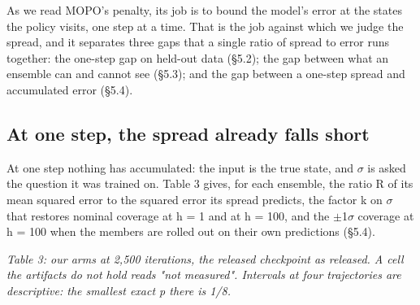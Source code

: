 \documentclass[10pt]{article}
\begin{document}
As we read MOPO's penalty, its job is to bound the model's error at the states the policy visits, one step at a time. That is the job against which we judge the spread, and it separates three gaps that a single ratio of spread to error runs together: the one-step gap on held-out data (\S{}5.2); the gap between what an ensemble can and cannot see (\S{}5.3); and the gap between a one-step spread and accumulated error (\S{}5.4).

\subsection{At one step, the spread already falls short}

At one step nothing has accumulated: the input is the true state, and $\sigma$ is asked the question it was trained on. Table 3 gives, for each ensemble, the ratio R of its mean squared error to the squared error its spread predicts, the factor k on $\sigma$ that restores nominal coverage at h = 1 and at h = 100, and the $\pm$1$\sigma$ coverage at h = 100 when the members are rolled out on their own predictions (\S{}5.4).

\begin{center}\small{}\end{center}

\emph{Table 3: our arms at 2,500 iterations, the released checkpoint as released. A cell the artifacts do not hold reads "not measured". Intervals at four trajectories are descriptive: the smallest exact p there is 1/8.}
\end{document}
